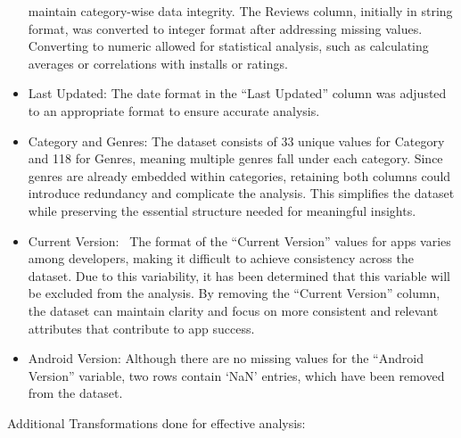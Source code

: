 \documentclass[
]{article}
\begin{document}
\begin{itemize}
  maintain category-wise data integrity. The Reviews column, initially
  in string format, was converted to integer format after addressing
  missing values. Converting to numeric allowed for statistical
  analysis, such as calculating averages or correlations with installs
  or ratings.
\item
  Last Updated: The date format in the ``Last Updated'' column was
  adjusted to an appropriate format to ensure accurate analysis.
\item
  Category and Genres: The dataset consists of 33 unique values for
  Category and 118 for Genres, meaning multiple genres fall under each
  category. Since genres are already embedded within categories,
  retaining both columns could introduce redundancy and complicate the
  analysis. This simplifies the dataset while preserving the essential
  structure needed for meaningful insights.
\item
  Current Version:~ The format of the ``Current Version'' values for
  apps varies among developers, making it difficult to achieve
  consistency across the dataset. Due to this variability, it has been
  determined that this variable will be excluded from the analysis. By
  removing the ``Current Version'' column, the dataset can maintain
  clarity and focus on more consistent and relevant attributes that
  contribute to app success.
\item
  Android Version: Although there are no missing values for the
  ``Android Version'' variable, two rows contain `NaN' entries, which
  have been removed from the dataset.
\end{itemize}

Additional Transformations done for effective analysis:
\end{document}
